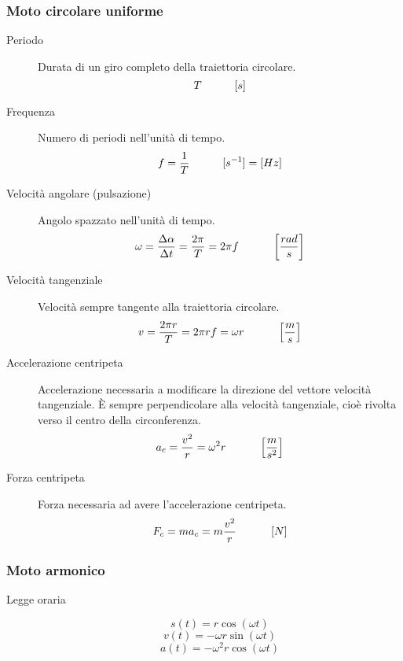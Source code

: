 \documentclass[a4paper,11pt,italian]{article}
\begin{document}
\subsubsection{Moto circolare uniforme}
\begin{description}
  \item[Periodo] 
  Durata di un giro completo della traiettoria circolare. 
  \[ T \hspace*{3em} [s] \]
  
  \item[Frequenza] 
  Numero di periodi nell'unità di tempo. 
  \[ f = \frac{1}{T} \hspace*{3em} [s^{-1}] = [ Hz] \]
  
  \item[Velocità angolare (pulsazione)] 
  Angolo spazzato nell'unità di tempo. 
  \[ \omega = \frac{\Delta\alpha}{\Delta t} = \frac{2 \pi}{T} = 2 \pi f \hspace*{3em} \left[ \frac{rad}{s} \right] \]
  
  \item[Velocità tangenziale] 
  Velocità sempre tangente alla traiettoria circolare. 
  \[ v = \frac{2 \pi r}{T} = 2\pi r f = \omega r  \hspace*{3em} \left[ \frac{m}{s} \right]\]
  
  \item[Accelerazione centripeta] 
  Accelerazione necessaria a modificare la direzione del vettore velocità tangenziale. È sempre perpendicolare alla velocità tangenziale, cioè rivolta verso il centro della circonferenza. 
  \[ a_c = \frac{v^2}{r} = \omega^2 r \hspace*{3em} \left[ \frac{m}{s^2} \right] \]
  
  \item[Forza centripeta] 
  Forza necessaria ad avere l'accelerazione centripeta. 
  \[ F_c = m  a_c = m  \frac{v^2}{r} \hspace*{3em} \left[ N \right] \]
\end{description}

\begin{soloscientifico} %
\subsubsection{Moto armonico}
\begin{description}
  \item[Legge oraria]  
  \[ s(t) = r \cos(\omega t) \] 
  \[ v(t) = - \omega r  \sin(\omega t) \] 
  \[ a(t) = - \omega^2 r  \cos(\omega t) \]
\end{description}
\end{soloscientifico}   %
\end{document}
